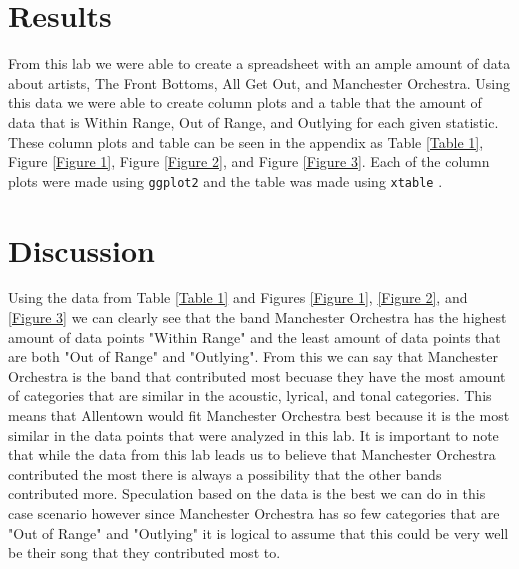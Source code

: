 \documentclass{article}\usepackage[]{graphicx}\usepackage[]{xcolor}
\begin{document}
\begin{multicols}{2}
\section{Results}
From this lab we were able to create a spreadsheet with an
ample amount of data about artists, The Front Bottoms, All
Get Out, and Manchester Orchestra. Using this data we were
able to create column plots and a table that the amount of data that is Within Range, Out of Range, and Outlying for each given statistic. These column plots and table can be seen in the appendix as Table \ref{Table 1}, Figure \ref{Figure 1}, Figure \ref{Figure 2}, and Figure \ref{Figure 3}. Each of the column plots were made using \texttt{ggplot2} and the table was made using \texttt{xtable} \citep{ggplot} \citep{xtable}.


\section{Discussion}

Using the data from Table \ref{Table 1} and Figures \ref{Figure 1}, \ref{Figure 2}, and \ref{Figure 3} we can clearly see that the band Manchester Orchestra has the highest amount of data points "Within Range" and the least amount of data points that are both "Out of Range" and "Outlying". From this we can say that Manchester Orchestra is the band that contributed most becuase they have the most amount of categories that are similar in the acoustic, lyrical, and tonal categories. This means that Allentown would fit Manchester Orchestra best because it is the most similar in the data points that were analyzed in this lab. It is important to note that while the data from this lab leads us to believe that Manchester Orchestra contributed the most there is always a possibility that the other bands contributed more. Speculation based on the data is the best we can do in this case scenario however since Manchester Orchestra has so few categories that are "Out of Range" and "Outlying" it is logical to assume that this could be very well be their song that they contributed most to. 

\vspace{2em}


\begin{tiny}

\end{tiny}
\end{multicols}
\end{document}
